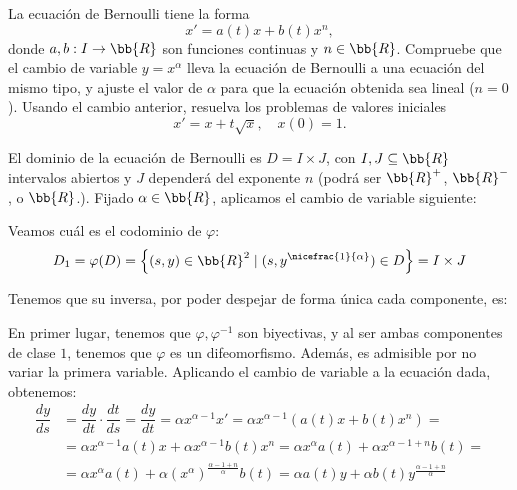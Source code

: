 \begin{ejercicio}
    La ecuación de Bernoulli tiene la forma
    \begin{equation*}
        x' = a(t)x + b(t)x^n,
    \end{equation*}
    donde $a, b : I \to \bb{R}$ son funciones continuas y $n \in \bb{R}$. Compruebe que el cambio de variable $y = x^\alpha$ lleva la ecuación de Bernoulli a una ecuación del mismo tipo, y ajuste el valor de $\alpha$ para que la ecuación obtenida sea lineal ($n = 0$). Usando el cambio anterior, resuelva los problemas de valores iniciales
    \begin{equation*}
        x' = x + t\sqrt{x}, \quad x(0) = 1.
    \end{equation*}

    El dominio de la ecuación de Bernoulli es $D=I\times J$, con $I,J\subseteq \bb{R}$ intervalos abiertos y $J$ dependerá del exponente $n$ (podrá ser $\bb{R}^+$, $\bb{R}^-$, o $\bb{R}$.).
    Fijado $\alpha\in \bb{R}$, aplicamos el cambio de variable siguiente:

    Veamos cuál es el codominio de $\varphi$:
    \begin{equation*}
        D_1=\varphi(D) = \left\{(s,y)\in \bb{R}^2 \mid (s, {y}^{\nicefrac{1}{\alpha}})\in D\right\} = I\times J
    \end{equation*}

    Tenemos que su inversa, por poder despejar de forma única cada componente, es:

    En primer lugar, tenemos que $\varphi,\varphi^{-1}$ son biyectivas, y al ser ambas componentes de clase $1$, tenemos que $\varphi$ es un difeomorfismo. Además, es admisible por no variar la primera variable.
    Aplicando el cambio de variable a la ecuación dada, obtenemos:
    \begin{align*}
        \dfrac{dy}{ds} &= \dfrac{dy}{dt}\cdot \dfrac{dt}{ds} = \dfrac{dy}{dt} = \alpha x^{\alpha-1}x' = \alpha x^{\alpha-1}\left(a(t)x + b(t)x^n\right)
        =\\&= \alpha x^{\alpha-1}a(t)x + \alpha x^{\alpha-1}b(t)x^n
        = \alpha x^\alpha a(t) + \alpha x^{\alpha-1+n}b(t)
        =\\&= \alpha x^\alpha a(t) + \alpha (x^\alpha)^{\frac{\alpha-1+n}{\alpha}}b(t)
        = \alpha a(t) y+ \alpha b(t)y^{\frac{\alpha-1+n}{\alpha}}
    \end{align*}


\end{ejercicio}
